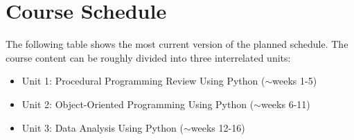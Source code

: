 \documentclass[11pt]{article}
\begin{document}
\section{Course Schedule}
The following table shows the most current version of the planned schedule. The course content can be roughly divided into three interrelated units:

\begin{itemize}
	\item Unit 1: Procedural Programming Review Using Python ($\sim$weeks 1-5)
	\item Unit 2: Object-Oriented Programming Using Python ($\sim$weeks 6-11)
	\item Unit 3: Data Analysis Using Python ($\sim$weeks 12-16)
\end{itemize}

\end{document}
